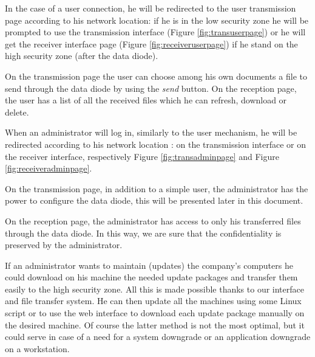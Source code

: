 \documentclass[a4paper,10pt]{article}
\begin{document}
In the case of a user connection, he will be redirected to the user transmission page according to his network location: if he is in the low security zone he will be prompted to use the transmission interface (Figure \ref{fig:transuserpage}) or he will get the receiver interface page (Figure \ref{fig:receiveruserpage}) if he stand on the high security zone (after the data diode). 

On the transmission page the user can choose among his own documents a file to send through the data diode by using the \textit{send} button. On the reception page, the user has a list of all the received files which he can refresh, download or delete.\bigskip 

When an administrator will log in, similarly to the user mechanism, he will be redirected according to his network location : on the transmission interface or on the receiver interface, respectively Figure \ref{fig:transadminpage} and Figure \ref{fig:receiveradminpage}.

On the transmission page, in addition to a simple user, the administrator has the power to configure the data diode, this will be presented later in this document.

On the reception page, the administrator has access to only his transferred files through the data diode. In this way, we are sure that the confidentiality is preserved by the administrator.  

If an administrator wants to maintain (updates) the company's computers he could download on his machine the needed update packages and transfer them easily to the high security zone. All this is made possible thanks to our interface and file transfer system. He can then update all the machines using some Linux script or to use the web interface to download each update package manually on the desired machine. Of course the latter method is not the most optimal, but it could serve in case of a need for a system downgrade or an application downgrade on a workstation. 
\end{document}
